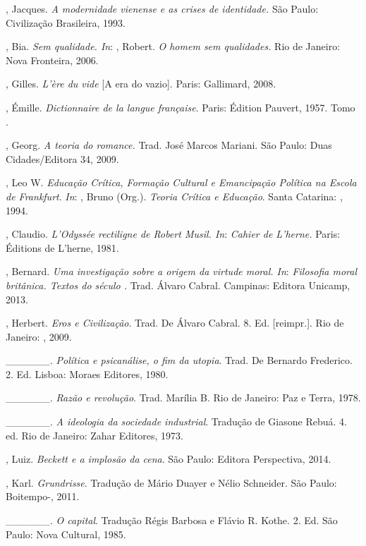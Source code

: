 \begin{Parskip}
, Jacques. \emph{A modernidade vienense e as crises de
identidade.} São Paulo: Civilização Brasileira, 1993.

, Bia. \emph{Sem qualidade. In}: , Robert. \emph{O homem sem
qualidades.} Rio de Janeiro: Nova Fronteira, 2006.

, Gilles. \emph{L'ère du vide} [A era do vazio]. Paris:
Gallimard, 2008.

, Émille. \emph{Dictionnaire de la langue française}. Paris:
Édition Pauvert, 1957. Tomo .

, Georg. \emph{A teoria do romance.} Trad. José Marcos Mariani.
São Paulo: Duas Cidades/Editora 34, 2009.

, Leo W. \emph{Educação Crítica, Formação Cultural e Emancipação Política
na Escola de Frankfurt}. \emph{In}: , Bruno (Org.). \emph{Teoria Crítica
e Educação}. Santa Catarina: , 1994.

, Claudio. \emph{L'Odyssée rectiligne de Robert Musil. In}:
\emph{Cahier de L'herne.} Paris: Éditions de L'herne, 1981.

, Bernard. \emph{Uma investigação sobre a origem da virtude
moral. In}: \emph{Filosofia moral britânica. Textos do século .}
Trad. Álvaro Cabral. Campinas: Editora Unicamp, 2013.

, Herbert. \emph{Eros e Civilização}. Trad. De Álvaro Cabral.
8. Ed. [reimpr.]. Rio de Janeiro: , 2009.

\_\_\_\_\_\_. \emph{Política e psicanálise, o fim da utopia}. Trad. De
Bernardo Frederico. 2. Ed. Lisboa: Moraes Editores, 1980.

\_\_\_\_\_\_. \emph{Razão e revolução}. Trad. Marília B. Rio
de Janeiro: Paz e Terra, 1978.

\_\_\_\_\_\_. \emph{A ideologia da sociedade industrial}. Tradução de
Giasone Rebuá. 4. ed. Rio de Janeiro: Zahar Editores, 1973.

, Luiz. \emph{Beckett e a implosão da cena}. São Paulo: Editora
Perspectiva, 2014.

, Karl. \emph{Grundrisse}. Tradução de Mário Duayer e Nélio
Schneider. São Paulo: Boitempo-, 2011.

\_\_\_\_\_\_. \emph{O capital}. Tradução Régis Barbosa e Flávio R.
Kothe. 2. Ed. São Paulo: Nova Cultural, 1985.


\end{Parskip}
